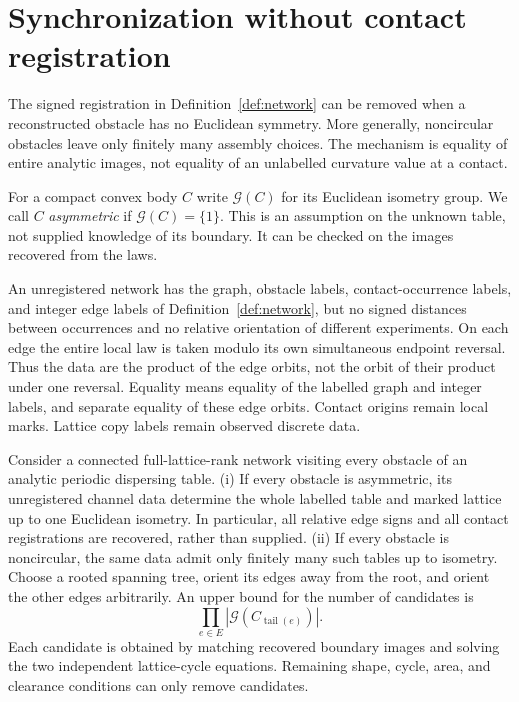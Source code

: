 \section{Synchronization without contact registration}
\label{sec:unregistered}
The signed registration in Definition~\ref{def:network} can be removed
when a reconstructed obstacle has no Euclidean symmetry. More generally,
noncircular obstacles leave only finitely many assembly choices. The
mechanism is equality of entire analytic images, not equality of an
unlabelled curvature value at a contact.

For a compact convex body $C$ write $\mathcal G(C)$ for its Euclidean
isometry group. We call $C$ \emph{asymmetric} if $\mathcal G(C)=\{1\}$.
This is an assumption on the unknown table, not supplied knowledge of
its boundary. It can be checked on the images recovered from the laws.

\begin{definition}\label{def:unregistered}
An unregistered network has the graph, obstacle labels, contact-occurrence
labels, and integer edge labels of Definition~\ref{def:network}, but no
signed distances between occurrences and no relative orientation of
different experiments. On each edge the entire local law is taken modulo
its own simultaneous endpoint reversal. Thus the data are the product
of the edge orbits, not the orbit of their product under one reversal.
Equality means equality of the labelled graph and integer labels, and
separate equality of these edge orbits. Contact origins remain local
marks. Lattice copy labels remain observed discrete data.
\end{definition}

\begin{theorem}
\label{thm:unregistered}
Consider a connected full-lattice-rank network visiting every obstacle of
an analytic periodic dispersing table.
\textup{(i)} If every obstacle is asymmetric, its unregistered channel
data determine the whole labelled table and marked lattice up to one
Euclidean isometry. In particular, all relative edge signs and all
contact registrations are recovered, rather than supplied.
\textup{(ii)} If every obstacle is noncircular, the same data admit only
finitely many such tables up to isometry. Choose a rooted spanning tree,
orient its edges away from the root, and orient the other edges arbitrarily.
An upper bound for the number of candidates is
\begin{equation}\label{eq:finiteassembly}
 \prod_{e\in E}|\mathcal G(C_{\operatorname{tail}(e)})|.
\end{equation}
Each candidate is obtained by matching recovered boundary images and
solving the two independent lattice-cycle equations. Remaining shape,
cycle, area, and clearance conditions can only remove candidates.
\end{theorem}

